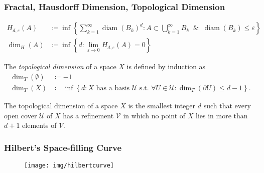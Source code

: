 \documentclass[UTF8,aspectratio=43,11pt,colorlinks,compress,openany]{beamer}%
\begin{document}
\begin{frame}\frametitle{Fractal, Hausdorff Dimension, Topological Dimension}
\setlength\abovedisplayskip{0pt}
\setlength\belowdisplayskip{0pt}
\begin{center}
\end{center}
\begin{align*}
H_{d,\varepsilon}(A)&\coloneqq \inf\left\{\sum_{k=1}^\infty\operatorname{diam}(B_k)^d: A\subset\bigcup_{k=1}^\infty B_k\;\;\&\;\;\operatorname{diam}(B_k)\leq\varepsilon\right\}\\
\dim_H(A)&\coloneqq \inf\left\{d:\lim_{\varepsilon\to 0} H_{d,\varepsilon}(A)=0\right\}
\end{align*}
\begin{definition}
The \emph{topological dimension} of a space $X$ is defined by induction as
\begin{align*}
\dim_T(\emptyset)&\coloneqq -1\\
\dim_T(X)&\coloneqq \inf\left\{d: X \textrm{ has a basis } \mathcal{U} \textrm{ s.t. } \forall U\in\mathcal{U}: \dim_T(\partial U)\leq d-1\right\}.
\end{align*}
\end{definition}
The topological dimension of a space $X$ is the smallest integer $d$ such that every open cover $\mathcal{U}$ of $X$ has a refinement $\mathcal{V}$ in which no point of $X$ lies in more than $d+1$ elements of $\mathcal{V}$.
\end{frame}

\begin{frame}\frametitle{Hilbert's Space-filling Curve}
	\begin{figure}
		\texttt{[image: img/hilbertcurve]}
	\end{figure}
	\begin{figure}
	\end{figure}
\end{frame}
\end{document}

